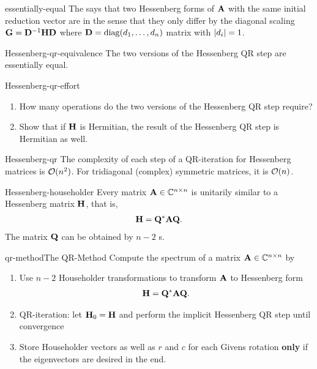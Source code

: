 \begin{Definition}{essentially-equal}
  The  says that two Hessenberg forms of $\mathbf A$ with the same initial reduction vector are  in the sense that they only differ by the diagonal scaling $\mathbf G = \mathbf D^{-1}\mathbf H\mathbf D$ where $\mathbf D=\operatorname{diag}(d_1,\dots,d_n)$ matrix with $\lvert d_{i}\rvert = 1$.
\end{Definition}

\begin{Corollary}{Hessenberg-qr-equivalence}
  The two versions of the Hessenberg QR step are essentially equal.
\end{Corollary}

\begin{Problem}{Hessenberg-qr-effort}
  \begin{enumerate}
  \item How many operations do the two versions of the Hessenberg QR step require?
  \item Show that if $\mathbf H$ is Hermitian, the result of the
    Hessenberg QR step is Hermitian as well.
  \end{enumerate}
\end{Problem}

\begin{Corollary}{Hessenberg-qr}
  The complexity of each step of a QR-iteration for Hessenberg matrices is $\mathcal O(n^2)$. For tridiagonal (complex) symmetric matrices, it is $\mathcal O(n)$.
\end{Corollary}

\begin{Theorem}{Hessenberg-householder}
  Every matrix $\mathbf A\in\mathbb C^{n\times n}$ is unitarily similar to a Hessenberg matrix $\mathbf H$, that is,
  \begin{gather}
    \mathbf H = \mathbf Q^* \mathbf A \mathbf Q.
  \end{gather}
  The matrix $\mathbf Q$ can be obtained by $n-2$ s.
\end{Theorem}

\begin{Algorithm*}{qr-method}{The QR-Method}
  Compute the spectrum of a matrix $\mathbf A\in\mathbb C^{n\times n}$ by
  \begin{enumerate}
  \item Use $n-2$ Householder transformations to transform $\mathbf A$ to
    Hessenberg form
    \begin{gather}
     \mathbf H = \mathbf Q^*\mathbf A\mathbf Q.
   \end{gather}
 \item QR-iteration: let $\mathbf H_{0}=\mathbf H$ and perform the implicit Hessenberg QR step until convergence
 \item Store Householder vectors as well as $r$ and $c$ for each
   Givens rotation \textbf{only} if the eigenvectors are desired in the end.
  \end{enumerate}
\end{Algorithm*}

